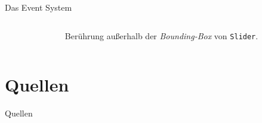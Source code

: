 \documentclass[12pt]{beamer}
\begin{document}
	\begin{frame}{Das Event System}
		\begin{columns}
			\begin{column}{0.6\textwidth}
				
			\end{column}
			\begin{column}{0.4\textwidth}
				\pause
				Berührung außerhalb der \emph{Bounding-Box} von \texttt{Slider}.
			\end{column}
		\end{columns}
		
	\end{frame}

	\section{Quellen}
	\begin{frame}{Quellen}
		\nocite{ts-holzinger}
		\nocite{I2C-spec_userManual}
		\nocite{stm32_refManual}
		\printbibliography
	\end{frame}
\end{document}
